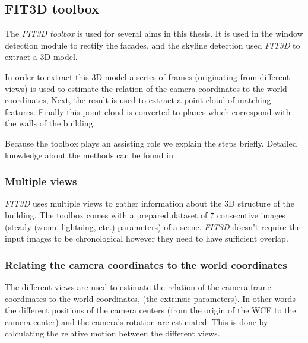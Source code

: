 \subsection{FIT3D toolbox \cite{FIT3D}}
\label{sec:prelimFIT3D}
The \emph{FIT3D toolbox} \cite{FIT3D} is used for several aims in this thesis.
It is used in the window detection module to rectify the facades.
and the skyline detection used \emph{FIT3D} to extract a 3D model.

In order to extract this 3D model a series of frames (originating from different
views) is used to estimate the relation of the camera coordinates to the
world coordinates, Next, the result is used to extract a point cloud of matching
features. Finally this point cloud is converted to planes which correspond with the walls of the building.

Because the toolbox plays an assisting role we explain the steps briefly.
Detailed knowledge about the methods can be found in \cite{FIT3D}.

\subsubsection{Multiple views}
\emph{FIT3D} uses multiple views to gather information about the 3D structure of the
building. The toolbox comes with a prepared dataset of 7 consecutive images (steady (zoom, lightning,
etc.) parameters) of a scene.  \emph{FIT3D} doesn't require the input images to be
chronological however they need to have sufficient overlap. 


\subsubsection{Relating the camera coordinates to the world coordinates}
The different views are used to estimate the relation of the camera frame
coordinates to the world coordinates, (the extrinsic parameters).  In other
words the different positions of the camera centers (from the origin of the WCF
to the camera center) and the camera's rotation are
estimated.  This is done by calculating the relative motion between the
different views.\\

